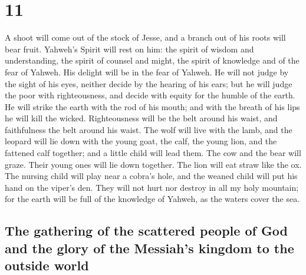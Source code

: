 \hypertarget{section-10}{%
\section{11}\label{section-10}}

 A shoot will come out of the stock of Jesse, and a branch
out of his roots will bear fruit.  Yahweh's Spirit will
rest on him: the spirit of wisdom and understanding, the spirit of
counsel and might, the spirit of knowledge and of the fear of Yahweh.
 His delight will be in the fear of Yahweh. He will not
judge by the sight of his eyes, neither decide by the hearing of his
ears;  but he will judge the poor with righteousness, and
decide with equity for the humble of the earth. He will strike the earth
with the rod of his mouth; and with the breath of his lips he will kill
the wicked.  Righteousness will be the belt around his
waist, and faithfulness the belt around his waist.  The
wolf will live with the lamb, and the leopard will lie down with the
young goat, the calf, the young lion, and the fattened calf together;
and a little child will lead them.  The cow and the bear
will graze. Their young ones will lie down together. The lion will eat
straw like the ox.  The nursing child will play near a
cobra's hole, and the weaned child will put his hand on the viper's den.
 They will not hurt nor destroy in all my holy mountain;
for the earth will be full of the knowledge of Yahweh, as the waters
cover the sea.

\hypertarget{the-gathering-of-the-scattered-people-of-god-and-the-glory-of-the-messiahs-kingdom-to-the-outside-world}{%
\subsection{The gathering of the scattered people of God and the glory
of the Messiah's kingdom to the outside
world}\label{the-gathering-of-the-scattered-people-of-god-and-the-glory-of-the-messiahs-kingdom-to-the-outside-world}}

